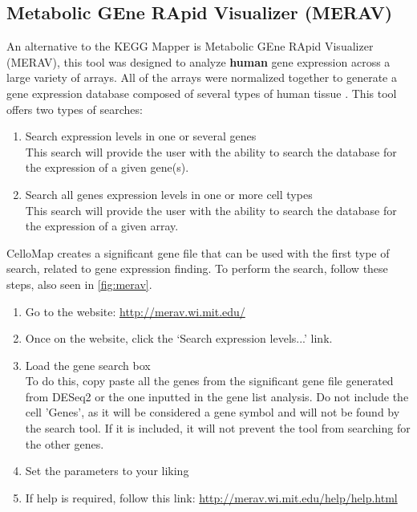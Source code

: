 \documentclass[11pt]{article}
\begin{document}
\subsection{Metabolic GEne RApid Visualizer (MERAV)\label{MERAV}}
An alternative to the \acrshort{KEGG} Mapper is Metabolic GEne RApid Visualizer (\acrshort{MERAV}), this tool was designed to analyze \textbf{human} gene expression across a large variety of arrays. All of the arrays were normalized together to generate a gene expression database composed of several types of human tissue \cite{shaul2015merav}.
This tool offers two types of searches:
\begin{enumerate}
\item Search expression levels in one or several genes\\
This search will provide the user with the ability to search the database for the expression of a given gene(s).
\item Search all genes expression levels in one or more cell types\\
This search will provide the user with the ability to search the database for the expression of a given array.
\end{enumerate}

CelloMap creates a significant gene file that can be used with the first type of search, related to gene expression finding. To perform the search, follow these steps, also seen in \autoref{fig:merav}.
\begin{enumerate}
\item Go to the website: \url{http://merav.wi.mit.edu/}
\item Once on the website, click the `Search expression levels...' link.
\item Load the gene search box\\
To do this, copy paste all the genes from the significant gene file generated from \acrshort{DESeq2} or the one inputted in the gene list analysis. Do not include the cell 'Genes', as it will be considered a gene symbol and will not be found by the search tool. If it is included, it will not prevent the tool from searching for the other genes.
\item Set the parameters to your liking
\item If help is required, follow this link: \url{http://merav.wi.mit.edu/help/help.html}
\end{enumerate}
\end{document}
